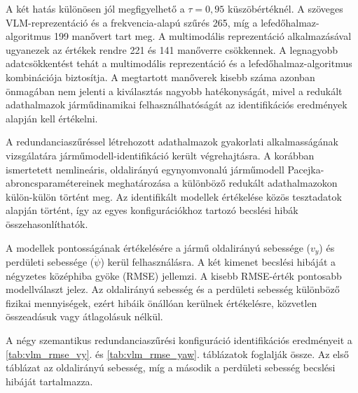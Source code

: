 \documentclass[12pt,a4paper,onehalfspacing, oneside]{book} %
\begin{document}
A két hatás különösen jól megfigyelhető a $\tau=0{,}95$ küszöbértéknél. A szöveges VLM-reprezentáció és a frekvencia-alapú szűrés 265, míg a lefedőhalmaz-algoritmus 199 manővert tart meg. A multimodális reprezentáció alkalmazásával ugyanezek az értékek rendre 221 és 141 manőverre csökkennek. A legnagyobb adatcsökkentést tehát a multimodális reprezentáció és a lefedőhalmaz-algoritmus kombinációja biztosítja. A megtartott manőverek kisebb száma azonban önmagában nem jelenti a kiválasztás nagyobb hatékonyságát, mivel a redukált adathalmazok járműdinamikai felhasználhatóságát az identifikációs eredmények alapján kell értékelni.

A redundanciaszűréssel létrehozott adathalmazok gyakorlati alkalmasságának vizsgálatára járműmodell-identifikáció került végrehajtásra. A korábban ismertetett nemlineáris, oldalirányú egynyomvonalú járműmodell Pacejka-abroncsparamétereinek meghatározása a különböző redukált adathalmazokon külön-külön történt meg. Az identifikált modellek értékelése közös tesztadatok alapján történt, így az egyes konfigurációkhoz tartozó becslési hibák összehasonlíthatók.

A modellek pontosságának értékelésére a jármű oldalirányú sebessége ($v_y$) és perdületi sebessége ($\dot{\psi}$) kerül felhasználásra. A két kimenet becslési hibáját a négyzetes középhiba gyöke (RMSE) jellemzi. A kisebb RMSE-érték pontosabb modellválaszt jelez. Az oldalirányú sebesség és a perdületi sebesség különböző fizikai mennyiségek, ezért hibáik önállóan kerülnek értékelésre, közvetlen összeadásuk vagy átlagolásuk nélkül.

A négy szemantikus redundanciaszűrési konfiguráció identifikációs eredményeit a \ref{tab:vlm_rmse_vy}. és \ref{tab:vlm_rmse_yaw}. táblázatok foglalják össze. Az első táblázat az oldalirányú sebesség, míg a második a perdületi sebesség becslési hibáját tartalmazza.
\end{document}

